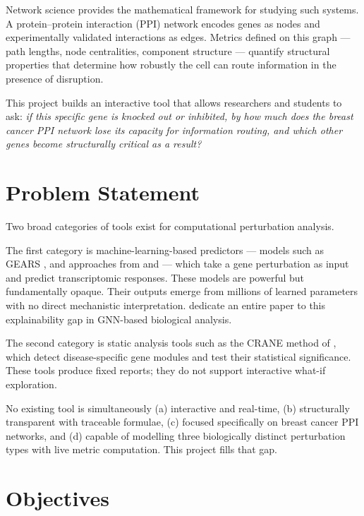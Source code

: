 \documentclass[12pt,a4paper]{report}
\begin{document}
Network science provides the mathematical framework for studying such systems. A protein–protein interaction (PPI) network encodes genes as nodes and experimentally validated interactions as edges. Metrics defined on this graph — path lengths, node centralities, component structure — quantify structural properties that determine how robustly the cell can route information in the presence of disruption.

This project builds an interactive tool that allows researchers and students to ask: \textit{if this specific gene is knocked out or inhibited, by how much does the breast cancer PPI network lose its capacity for information routing, and which other genes become structurally critical as a result?}

\section{Problem Statement}

Two broad categories of tools exist for computational perturbation analysis.

The first category is machine-learning-based predictors — models such as GEARS \citep{roohani2023gears}, and approaches from \citet{gonzalez2024combinatorial} and \citet{miladinovic2025silico} — which take a gene perturbation as input and predict transcriptomic responses. These models are powerful but fundamentally opaque. Their outputs emerge from millions of learned parameters with no direct mechanistic interpretation. \citet{petre2022explainability} dedicate an entire paper to this explainability gap in GNN-based biological analysis.

The second category is static analysis tools such as the CRANE method of \citet{lim2021generating}, which detect disease-specific gene modules and test their statistical significance. These tools produce fixed reports; they do not support interactive what-if exploration.

No existing tool is simultaneously (a) interactive and real-time, (b) structurally transparent with traceable formulae, (c) focused specifically on breast cancer PPI networks, and (d) capable of modelling three biologically distinct perturbation types with live metric computation. This project fills that gap.

\section{Objectives}
\end{document}
